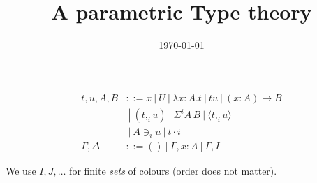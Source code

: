\documentclass[10pt,a4paper]{article}
\title{A parametric Type theory}
\author{}
\date{\today}
\newcommand\CP[3]{(#2,_{#1} #3)}
\newcommand\param[1]{\!\cdot\!#1}
\newcommand\op[1]{∋_{#1}}
\newcommand\ip[3]{Σ^{#1} {#2}\,{#3}}
\newcommand\fp[3]{⟨#2 ,_{#1} #3⟩}
\begin{document}
\maketitle


\begin{definition}
  
  \begin{align*}
    t,u,A,B & ::= x ~|~ U ~|~ λx:A. t      ~|~ t u ~|~ (x:A) → B \\
            & ~|~ \CP i t u  ~|~ \ip i A B  ~|~ \fp i t u \\
            & ~|~ A \op i u ~|~ t \param i  \\
    \Gamma,\Delta & ::= () ~|~ \Gamma,x:A ~|~ \Gamma,I
  \end{align*}
\end{definition}

We use $I,J,…$ for finite {\em sets} of colours (order does not matter).
\end{document}
